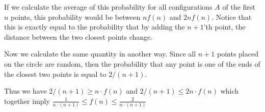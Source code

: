 \begin{solution}
If we calculate the average of this probability for all configurations $A$ of the first $n$ points, this probability would be between
$nf(n)$
and $2nf(n)$.  Notice that this is exactly equal to the probability that by adding the $n+1$'th point, the distance between the two closest points change.

Now we calculate the same quantity in another way.
Since all $n+1$ points placed on the circle are random, then the probability that any point is one of the ends of the closest two points is equal to
$2/(n+1)$.

Thus we have $2/(n+1) \geq n\cdot f(n)$ and $2/(n+1) \leq 2n\cdot f(n)$ which together imply $\frac{1}{n\cdot(n+1)} \leq f(n) \leq \frac{2}{n\cdot(n+1)}$
\end{solution}